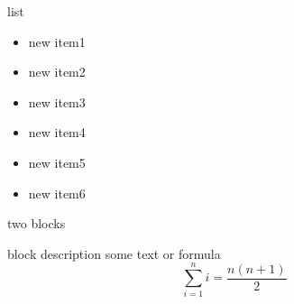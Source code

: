 \documentclass[final]{beamer} %
\begin{document}
\begin{frame}
% 
  \begin{minipage}[t]{.49\textwidth}
    \begin{kasten}{\large list}
      \begin{itemize}
        \item new item1
        \item new item2
        \item new item3
        \item new item4
        \item new item5
        \item new item6
      \end{itemize}
    \end{kasten}
    \begin{kasten}{\large two blocks}

      \begin{kasten}{block description}
        some text or formula $$\sum\limits_{i=1}^n i = \frac{n (n+1)}{2}$$
      \end{kasten}


\end{kasten}
\end{minipage}
\end{frame}
\end{document}
